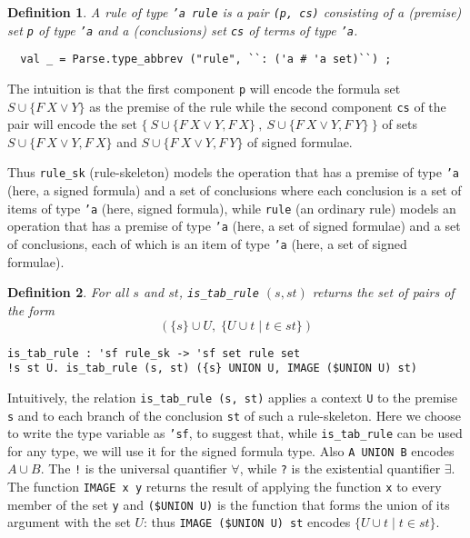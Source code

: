 \documentclass[a4paper]{article}
\newtheorem{definition}{Definition}
\begin{document}
\begin{definition}
  A rule of type \texttt{'a rule} is a pair
  \texttt{(p, cs)}
  consisting of a (premise) set
  \texttt{p}
  of type
  \texttt{'a} and a (conclusions) set
  \texttt{cs}
  of terms of type \texttt{'a}. 
\begin{verbatim}
  val _ = Parse.type_abbrev ("rule", ``: ('a # 'a set)``) ;
\end{verbatim}
\end{definition}

The intuition is that the first component
\texttt{p}
will encode the formula set 
$S \cup \{ F ~ X \lor Y \}$ as the premise of the
rule while 
the second component
\texttt{cs}
of the pair will encode the set 
$\{~S \cup \{F ~ X \lor Y, F~ X\}~ , ~S \cup\{F ~ X \lor Y, F~ Y\}~\}$ 
of sets
$S \cup \{F ~ X \lor Y, F~ X\}$
and
$S \cup \{F ~ X \lor Y, F~ Y\}$
of signed formulae.

Thus \texttt{rule\_sk} (rule-skeleton) models the operation that has 
a premise of type \texttt{'a} (here, a signed formula)
and a set of conclusions
where each conclusion is a set of items of type \texttt{'a} (here,
signed formula), while \texttt{rule} (an ordinary rule) models an
operation that has a premise
of type \texttt{'a} (here, a set of signed formulae) and a set
of conclusions, each of which is an item of type \texttt{'a} 
(here, a set of signed formulae).

\begin{definition}
  For all $s$ and $st$,
  \texttt{is\_tab\_rule} $(s, st)$
  returns the set of pairs of the form
  $$(\{s\} \cup U, \;\{U \cup t \mid t \in st\})$$
\begin{verbatim}
is_tab_rule : 'sf rule_sk -> 'sf set rule set
!s st U. is_tab_rule (s, st) ({s} UNION U, IMAGE ($UNION U) st) 
\end{verbatim}
\end{definition}

Intuitively, the relation
\texttt{is\_tab\_rule (s, st)} applies a context \texttt{U} to
the premise \texttt{s} and to each branch of the conclusion
\texttt{st} of such a rule-skeleton.
Here we choose to write the type variable as \texttt{'sf}, to suggest that,
while \texttt{is\_tab\_rule} can be used for any type, we will use it
for the signed formula type.
Also \texttt{A UNION B} encodes $A \cup B$.
The \texttt{!} is the universal quantifier $\forall$,
while \texttt{?} is the existential quantifier $\exists$.
The function
\texttt{IMAGE x y}
returns the result of applying the function
\texttt{x}
to every member of the set
\texttt{y} and 
\texttt{(\$UNION U)} is 
the function that forms the union of its argument with the set $U$:
thus 
\texttt{IMAGE (\$UNION U) st} encodes
$\{U \cup t \mid t \in st\}$.
\end{document}
